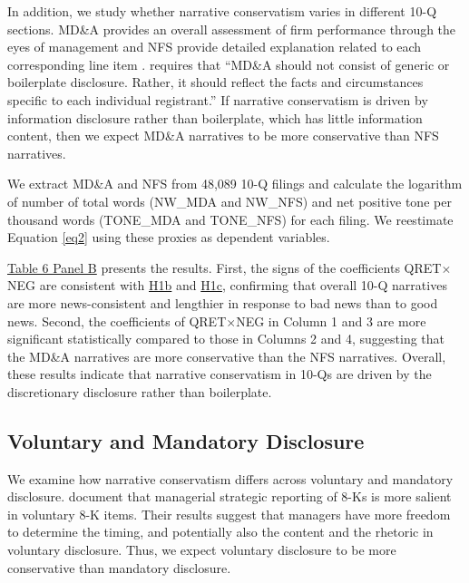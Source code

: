 \documentclass[letterpaper,12pt]{article}
\begin{document}
\begin{spacing}{1.5}
In addition, we study whether narrative conservatism varies in different 10-Q sections. MD\&A provides an overall assessment of firm performance through the eyes of management and NFS provide detailed explanation related to each corresponding line item \cite{fasbConceptualFrameworkFinancial2018a, secFinancialReportingManual2019}.  requires that ``MD\&A should not consist of generic or boilerplate disclosure. Rather, it should reflect the facts and circumstances specific to each individual registrant.'' If narrative conservatism is driven by information disclosure rather than boilerplate, which has little information content, then we expect MD\&A narratives to be more conservative than NFS narratives.

We extract MD\&A and NFS from 48,089 10-Q filings and calculate the logarithm of number of total words (NW\_MDA and NW\_NFS) and net positive tone per thousand words (TONE\_MDA and TONE\_NFS) for each filing. We reestimate Equation \eqref{eq2} using these proxies as dependent variables.

\hyperref[T6PB]{Table 6 Panel B} presents the results. First, the signs of the coefficients QRET$\times$NEG are consistent with \hyperref[hyp:h1b]{H1b} and \hyperref[hyp:h1c]{H1c}, confirming that overall 10-Q narratives are more news-consistent and lengthier in response to bad news than to good news. Second, the coefficients of QRET$\times$NEG in Column 1 and 3 are more significant statistically compared to those in Columns 2 and 4, suggesting that the MD\&A narratives are more conservative than the NFS narratives. Overall, these results indicate that narrative conservatism in 10-Qs are driven by the discretionary disclosure rather than boilerplate.

\subsection{Voluntary and Mandatory Disclosure}
\noindent We examine how narrative conservatism differs across voluntary and mandatory disclosure.  document that managerial strategic reporting of 8-Ks is more salient in voluntary 8-K items. Their results suggest that managers have more freedom to determine the timing, and potentially also the content and the rhetoric in voluntary disclosure. Thus, we expect voluntary disclosure to be more conservative than mandatory disclosure.


\end{spacing}
\end{document}
